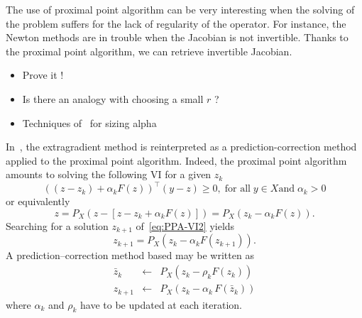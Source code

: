 The use of proximal point algorithm can be very interesting when the solving of the problem suffers for the lack of regularity of the operator. For instance, the Newton methods are in trouble when the Jacobian is not invertible. Thanks to the proximal point algorithm, we can retrieve invertible Jacobian.

\begin{ndrva}
  \begin{itemize}
  \item Prove it !
  \item Is there an analogy with choosing a small $r$ ?
  \item Techniques of~\citep{Han_JCAM2008} for sizing alpha
  \end{itemize}
\end{ndrva}

In~\citep{He.Liao_JOTA2002}, the extragradient method is reinterpreted as a prediction-correction method applied to the proximal point algorithm. Indeed, the proximal point algorithm amounts to solving the following VI for a given $z_k$
\begin{equation}
  \label{eq:PPA-VI1}
  ((z-z_k)+ \alpha_k F(z))^\top(y-z) \geq 0, \;\text{for all}\; y \in X \text{and}\; \alpha_k >0
\end{equation}
or equivalently
\begin{equation}
  \label{eq:PPA-VI2}
  z = P_{X}(z - [z - z_k + \alpha_k F(z)]) = P_{X}( z_k - \alpha_k F(z)).
\end{equation}
Searching for a solution $z_{k+1}$ of~\eqref{eq:PPA-VI2} yields
\begin{equation}
  \label{eq:PPA-VI3}
  z_{k+1} = P_{X}( z_k - \alpha_k F(z_{k+1})).
\end{equation}
A prediction--correction method based may be written as
\begin{equation}
  \label{eq:PPA-VI4}
  \begin{array}{lcl}
    \bar z_{k} &\leftarrow& P_X(z_k-\rho_k F(z_k))\\
    z_{k+1} &\leftarrow& P_X(z_{k}-\alpha_k\,F(\bar z_k))
  \end{array}
\end{equation}
where  $\alpha_k$ and $\rho_k$ have to be updated at each iteration.
\fi

